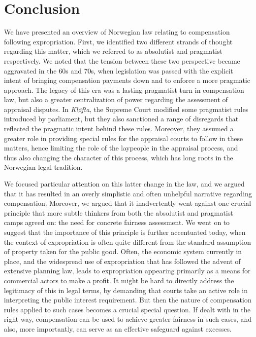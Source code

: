 \section{Conclusion}

We have presented an overview of Norwegian law relating to compensation following expropriation. First, we identified two different strands of thought regarding this matter, which we referred to as absolutist and pragmatist respectively. We noted that the tension between these two perspective became aggravated in the 60s and 70s, when legislation was passed with the explicit intent of bringing compensation payments down and to enforce a more pragmatic approach. The legacy of this era was a lasting pragmatist turn in compensation law, but also a greater centralization of power regarding the assessment of appraisal disputes. In \emph{Kløfta}, the Supreme Court modified some pragmatist rules introduced by parliament, but they also sanctioned a range of disregards that reflected the pragmatic intent behind these rules. Moreover, they assumed a greater role in providing special rules for the appraisal courts to follow in these matters, hence limiting the role of the laypeople in the appraisal process, and thus also changing the character of this process, which has long roots in the Norwegian legal tradition.

We focused particular attention on this latter change in the law, and we argued that it has resulted in an overly simplistic and often unhelpful narrative regarding compensation. Moreover, we argued that it inadvertently went against one crucial principle that more subtle thinkers from both the absolutist and pragmatist camps agreed on: the need for concrete fairness assessment. We went on to suggest that the importance of this principle is further accentuated today, when the context of expropriation is often quite different from the standard assumption of property taken for the public good. Often, the economic system currently in place, and the widespread use of expropriation that has followed the advent of extensive planning law, leads to expropriation appearing primarily as a means for commercial actors to make a profit. It might be hard to directly address the legitimacy of this in legal terms, by demanding that courts take an active role in interpreting the public interest requirement. But then the nature of compensation rules applied to such cases becomes a crucial special question. If dealt with in the right way, compensation can be used to achieve greater fairness in such cases, and also, more importantly, can serve as an effective safeguard against excesses. 

